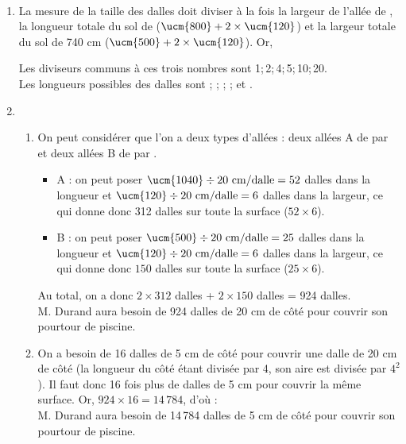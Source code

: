 \ \\ [-5mm]
  \begin{enumerate}
      \item La mesure de la taille des dalles doit diviser à la fois la largeur de l'allée de , la longueur totale du sol de  ($\ucm{800}+2\times\ucm{120}$) et la largeur totale du sol de 740 cm ($\ucm{500}+2\times\ucm{120}$). Or, \\
      Les diviseurs communs à ces trois nombres sont 1;\,2;\,4;\,5;\,10;\,20. \\
      {\blue Les longueurs possibles des dalles sont  ;   ;  ;  ;  et .}
      \item
      \begin{enumerate}
         \item On peut considérer que l'on a deux types d'allées : deux allées A de  par  et deux allées B de  par .
         \begin{itemize}
            \item A : on peut poser $\ucm{1040}\div20 \text{ cm/dalle} =52$ dalles dans la longueur et $\ucm{120}\div20\text{ cm/dalle} =6$ dalles dans la largeur, ce qui donne donc 312 dalles sur toute la surface ($52\times6$).
            \item B : on peut poser $\ucm{500}\div20 \text{ cm/dalle}=25$ dalles dans la longueur et $\ucm{120}\div20\text{ cm/dalle} =6$ dalles dans la largeur, ce qui donne donc $150$ dalles sur toute la surface ($25\times6$).
         \end{itemize}
         Au total, on a donc $2\times312$ dalles + $2\times150$ dalles = 924 dalles. \\
         {\blue M. Durand aura besoin de 924 dalles de 20 cm de côté pour couvrir son pourtour de piscine.}
         \item On a besoin de 16 dalles de 5 cm de côté pour couvrir une dalle de 20 cm de côté (la longueur du côté étant divisée par 4, son aire est divisée par $4^2$). Il faut donc 16 fois plus de dalles de 5 cm pour couvrir la même surface. Or, $924\times16 =14\,784$, d'où : \\
         {\blue M. Durand aura besoin de 14\,784 dalles de 5 cm de côté pour couvrir son pourtour de piscine.}
      \end{enumerate}
   \end{enumerate}
